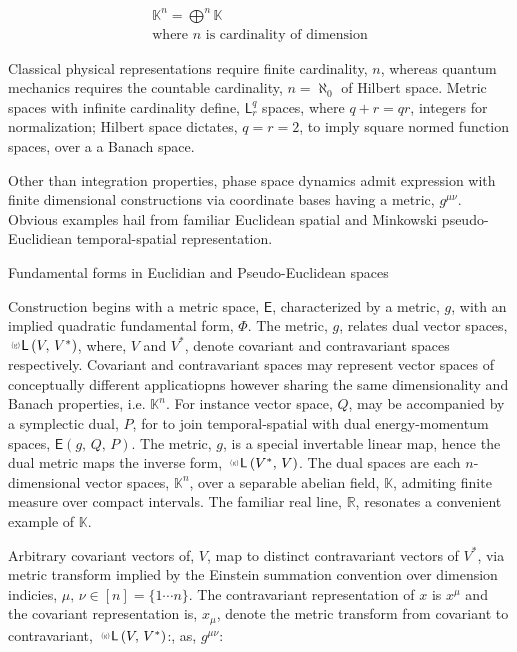 \documentclass[aps,twocolumn,secnumarabic,nobalancelastpage,amsmath,amssymb,
amsthm,nofootinbib,parskip=full]{revtex4}
\numberwithin{equation}{section}
\newcommand{\smetric}[2]{\mathsf{E}\pa{g,\,#1,\,#2}}
\newcommand{\lmetric}[2]{\ppv{g}{\mathsf{L}}\pa{#1,\,#2}}
\newcommand{\ppv}[2]{{\,\raisebox{2pt}{\scalebox{.5}{(#1)\,}}}#2}
\newcommand{\pa}[1]{\left(#1\right)}
\begin{document}
\begin{equation*}
\begin{array}{c}
\mathbb{K}^n=\bigoplus^n \mathbb{K} \\[7pt]
\text{where $n$ is cardinality of dimension}
\end{array}
\end{equation*}

Classical physical representations require finite cardinality, $n$,
whereas quantum mechanics requires the countable cardinality, $n=\aleph_0$
of Hilbert space.
Metric spaces with infinite cardinality define, 
$\mathsf{L}^q_r$ spaces, where $q+r=qr$, integers for normalization;
Hilbert space dictates, $q=r=2$, to imply square normed function spaces,
over a a Banach space.

Other than integration properties, phase space dynamics
admit expression with finite dimensional
constructions via coordinate bases having a metric, $g^{\mu\nu}$.
Obvious examples hail from familiar
Euclidean spatial and Minkowski pseudo-Euclidiean
temporal-spatial representation.

Fundamental forms in Euclidian and Pseudo-Euclidean spaces

Construction begins with a metric space, $\mathsf{E}$,
characterized by a metric, $g$, with an implied
quadratic fundamental form, $\Phi$.
The metric, $g$, relates dual vector spaces, $\lmetric{V}{V^*}$,
where, $V$ and $V^*$, denote
covariant and contravariant spaces respectively.
Covariant and contravariant spaces may represent vector
spaces of conceptually different applicatiopns however
sharing the same dimensionality and Banach properties, i.e. $\mathbb{K}^n$.
For instance vector space, $Q$, may be accompanied by a
symplectic dual, $P$, for to join
temporal-spatial with dual energy-momentum spaces, $\smetric{Q}{P}$.
The metric, $g$, is a special invertable linear map,
hence the dual metric maps the inverse form,
$\lmetric{V^*}{V}$.
The dual spaces are each $n$-dimensional vector spaces, $\mathbb{K}^n$,
over a separable abelian field,
$\mathbb{K}$, admiting finite measure over compact intervals.
The familiar real line, $\mathbb{R}$, resonates a convenient
example of $\mathbb{K}$.

Arbitrary covariant vectors of, $V$, map to distinct contravariant
vectors of $V^*$, via metric transform implied by the
Einstein summation convention over dimension indicies,
$\mu,\,\nu\in [n]=\{1\cdots n\}$.
The contravariant representation of $x$ is $x^\mu$
and the covariant representation is, $x_\mu$, denote
the metric transform from covariant to contravariant,
$\lmetric{V}{V^*}$:, as, $g^{\mu\nu}$:
\end{document}
